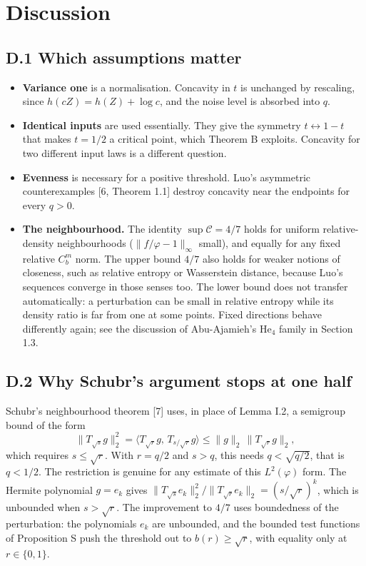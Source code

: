 \documentclass[
  british,
  10pt,
]{article}
\providecommand{\tightlist}{%
  \setlength{\itemsep}{0pt}\setlength{\parskip}{0pt}}
\begin{document}
\section{Discussion}\label{discussion}

\subsection{D.1 Which assumptions
matter}\label{d.1-which-assumptions-matter}

\begin{itemize}
\tightlist
\item
  \textbf{Variance one} is a normalisation. Concavity in \(t\) is
  unchanged by rescaling, since \(h(cZ)=h(Z)+\log c\), and the noise
  level is absorbed into \(q\).
\item
  \textbf{Identical inputs} are used essentially. They give the symmetry
  \(t\leftrightarrow1-t\) that makes \(t=1/2\) a critical point, which
  Theorem B exploits. Concavity for two different input laws is a
  different question.
\item
  \textbf{Evenness} is necessary for a positive threshold. Luo's
  asymmetric counterexamples {[}6, Theorem 1.1{]} destroy concavity near
  the endpoints for every \(q>0\).
\item
  \textbf{The neighbourhood.} The identity \(\sup\mathcal C=4/7\) holds
  for uniform relative-density neighbourhoods
  (\(\|f/\varphi-1\|_\infty\) small), and equally for any fixed relative
  \(C_b^m\) norm. The upper bound \(4/7\) also holds for weaker notions
  of closeness, such as relative entropy or Wasserstein distance,
  because Luo's sequences converge in those senses too. The lower bound
  does not transfer automatically: a perturbation can be small in
  relative entropy while its density ratio is far from one at some
  points. Fixed directions behave differently again; see the discussion
  of Abu-Ajamieh's \(\mathrm{He}_4\) family in Section 1.3.
\end{itemize}

\subsection{D.2 Why Schubr's argument stops at one
half}\label{d.2-why-schubrs-argument-stops-at-one-half}

Schubr's neighbourhood theorem {[}7{]} uses, in place of Lemma I.2, a
semigroup bound of the form \[
\|T_{\sqrt s}g\|_2^2=\langle T_{\sqrt r}g,\,T_{s/\sqrt r}g\rangle\le\|g\|_2\,\|T_{\sqrt r}g\|_2,
\] which requires \(s\le\sqrt r\). With \(r=q/2\) and \(s>q\), this
needs \(q<\sqrt{q/2}\), that is \(q<1/2\). The restriction is genuine
for any estimate of this \(L^2(\varphi)\) form. The Hermite polynomial
\(g=e_k\) gives
\(\|T_{\sqrt s}e_k\|_2^2/\|T_{\sqrt r}e_k\|_2=(s/\sqrt r)^k\), which is
unbounded when \(s>\sqrt r\). The improvement to \(4/7\) uses
boundedness of the perturbation: the polynomials \(e_k\) are unbounded,
and the bounded test functions of Proposition S push the threshold out
to \(b(r)\ge\sqrt r\), with equality only at \(r\in\{0,1\}\).
\end{document}
